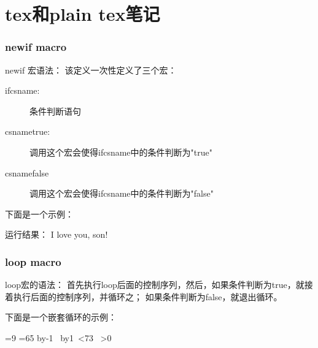 \documentclass{article}
\begin{document}
  \tt %

  \pagestyle{header}
  \sybmaketitle
  \tableofcontents
  \newpage

  \pagestyle{main}
  \setcounter{page}{1}

  \part[tex和plain tex笔记]{tex和plain tex笔记}
  \section[newif macro]{\bs newif macro}
  \bs newif 宏语法：
  该定义一次性定义了三个宏：
  \begin{description}
    \item[\bs if\lt csname\gt:] 条件判断语句
    \item[\bs\lt csname\gt true:] 调用这个宏会使得\bs if\lt csname\gt 中的条件判断为"true"
    \item[\bs\lt csname\gt false] 调用这个宏会使得\bs if\lt csname\gt 中的条件判断为"false"
  \end{description}
  下面是一个示例：

  \begin{latexcode}
\newif\ifboy
\newif\ifgirl
\ifboytrue
\ifboy{I love you, son!}\fi
\ifgirl{I love you, daughter!}\fi
  \end{latexcode}

  运行结果：
  \newif\ifboy
  \newif\ifgirl
  \boytrue
  \ifboy{I love you, son!}\fi
  \ifgirl{I love you, daughter!}\fi

  \section[loop macro]{loop macro}
  \bs loop宏的语法：
  首先执行\bs loop后面的控制序列，然后，如果条件判断为true，就接着执行后面的控制序列，并循环之；
  如果条件判断为false，就退出循环。

  下面是一个嵌套循环的示例：

  \begin{latexcode}
\vbox{
  =9
  \loop
    =65 %
    \advance{} by-1
    \hbox{%
      \loop
      \char{} \the{}
      \advance{} by1
      \ifnum{}<73
      \space
      \repeat
    }
  \ifnum{}>0
  \repeat
}
  \end{latexcode}
\end{document}
